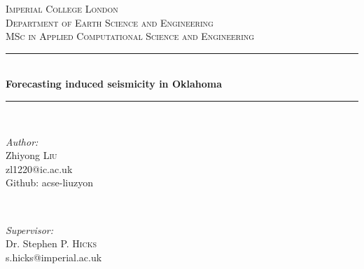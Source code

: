 \documentclass[final-report]{report-template}
\begin{document}
\begin{titlepage}

\newcommand{\HRule}{\rule{\linewidth}{0.5mm}} %

\center %


\textsc{\LARGE Imperial College London}\\[1.5cm] %
\textsc{\Large Department of Earth Science and Engineering}\\[0.5cm] %
\textsc{\large MSc in Applied Computational Science and Engineering}\\[0.5cm] %


\HRule \\[0.4cm]
{ \huge \bfseries Forecasting induced seismicity in Oklahoma}\\[0.4cm] %
\HRule \\[1.5cm]

\begin{minipage}{0.4\textwidth}
    \begin{flushleft} \large
    \emph{Author:}\\
    Zhiyong \textsc{Liu}\\ %
    zl1220@ic.ac.uk\\
    Github: acse-liuzyon
    \end{flushleft}
    \end{minipage}
    ~
    \begin{minipage}{0.4\textwidth}
    \begin{flushright} \large
    \emph{Supervisor:} \\
    Dr. Stephen P. \textsc{Hicks}\\ %
    s.hicks@imperial.ac.uk
    \end{flushright}
\end{minipage}\\[2cm]


\end{titlepage}
\end{document}
